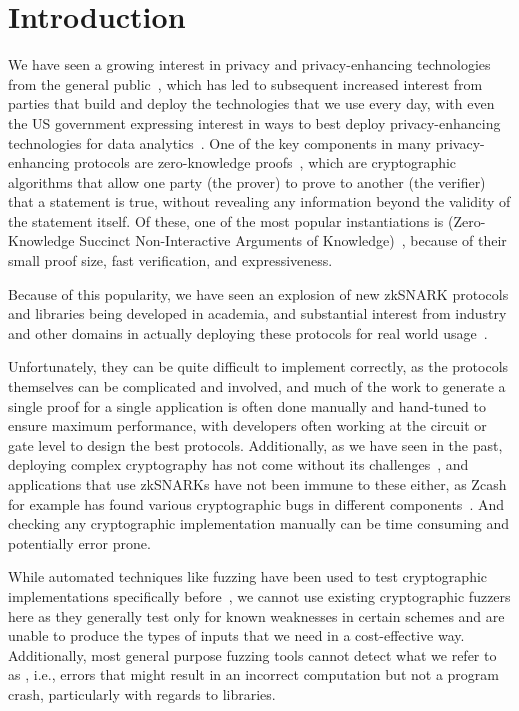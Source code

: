 \section{Introduction}
\label{sec:snarkprobe-introduction}

We have seen a growing interest in privacy and privacy-enhancing technologies from the general public~\cite{adoption}, which has led to subsequent increased interest from parties that build and deploy the technologies that we use every day, with even the US government expressing interest in ways to best deploy privacy-enhancing technologies for data analytics~\cite{usgov}.
One of the key components in many privacy-enhancing protocols are zero-knowledge proofs~\cite{goldreich2019proofs}, which are cryptographic algorithms that allow one party (the prover) to prove to another (the verifier) that a statement is true, without revealing any information beyond the validity of the statement itself.
Of these, one of the most popular instantiations is \zksnark (Zero-Knowledge Succinct Non-Interactive Arguments of Knowledge)~\cite{ben2013snarks,parno2016pinocchio,groth2016size}, because of their small proof size, fast verification, and expressiveness.

Because of this popularity, we have seen an explosion of new zkSNARK protocols and libraries being developed in academia, and substantial interest from industry and other domains in actually deploying these protocols for real world usage~\cite{zcash,darkforest,aleo,filecoin,zkrollup}.


Unfortunately, they can be quite difficult to implement correctly, as the protocols themselves can be complicated and involved, and much of the work to generate a single proof for a single application is often done manually and hand-tuned to ensure maximum performance, with developers often working at the circuit or gate level to design the best protocols.  Additionally, as we have seen in the past, deploying complex cryptography has not come without its challenges~\cite{garman2016dancing,naveed2015inference,curveball,rupprecht2020call}, and applications that use zkSNARKs have not been immune to these either, as Zcash for example has found various cryptographic bugs in different components~\cite{zcashcounterfeit,zcashvulns,zcashaudit}.  And checking any cryptographic implementation manually can be time consuming and potentially error prone.

While automated techniques like fuzzing have been used to test cryptographic implementations specifically before~\cite{aumasson2017automated}, we cannot use existing cryptographic fuzzers here as they generally test only for known weaknesses in certain schemes and are unable to produce the types of inputs that we need in a cost-effective way.
Additionally, most general purpose fuzzing tools cannot detect what we refer to as \textit{}, i.e., errors that might result in an incorrect computation but not a program crash, particularly with regards to \zksnark libraries.


